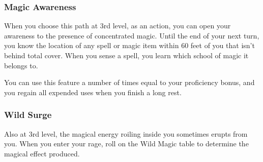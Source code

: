 {\subsubsection*{Magic Awareness}
When you choose this path at 3rd level, as an action, you can open your awareness to the presence of concentrated magic. Until the end of your next turn, you know the location of any spell or magic item within 60 feet of you that isn’t behind total cover. When you sense a spell, you learn which school of magic it belongs to.

You can use this feature a number of times equal to your proficiency bonus, and you regain all expended uses when you finish a long rest.
\subsubsection*{Wild Surge}
Also at 3rd level, the magical energy roiling inside you sometimes erupts from you. When you enter your rage, roll on the Wild Magic table to determine the magical effect produced.

}
